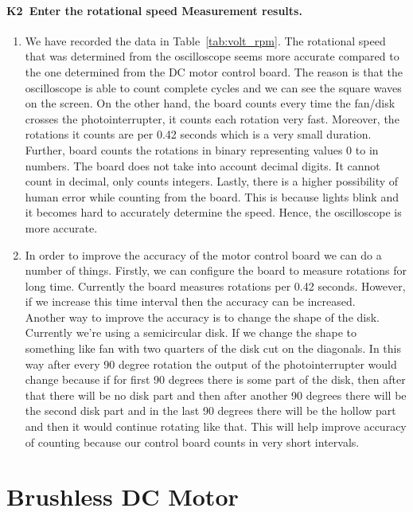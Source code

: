 \documentclass[12pt,a4paper]{report}
\begin{document}
\subsubsection{K2\ Enter the rotational speed Measurement results.}
\begin{enumerate}
	\item We have recorded the data in Table~\ref{tab:volt_rpm}. The rotational speed that was determined from the oscilloscope seems more accurate compared to the one determined from the DC motor control board. The reason is that the oscilloscope is able to count complete cycles and we can see the square waves on the screen. On the other hand, the board counts every time the fan/disk crosses the photointerrupter, it counts each rotation very fast. Moreover, the rotations it counts are per 0.42 seconds which is a very small duration. Further, board counts the rotations in binary representing values 0 to  in  numbers. The board does not take into account decimal digits. It cannot count in decimal, only counts integers. Lastly, there is a higher possibility of human error while counting from the board. This is because lights blink and it becomes hard to accurately determine the speed. Hence, the oscilloscope is more accurate. \\
	\item In order to improve the accuracy of the motor control board we can do a number of things. Firstly, we can configure the board to measure rotations for long time. Currently the board measures rotations per 0.42 seconds. However, if we increase this time interval then the accuracy can be increased. \\
		Another way to improve the accuracy is to change the shape of the disk. Currently we're using a semicircular disk. If we change the shape to something like fan with two quarters of the 
		disk cut on the diagonals. In this way after every 90 degree rotation the output of the photointerrupter would change because if for first 90 degrees there is some part of the disk, then 
		after that there will be no disk part and then after another 90 degrees there will be the second disk part and in the last 90 degrees there will be the hollow part 
		and then it would continue rotating like that. This will help improve accuracy of counting because our control board counts in very short intervals. 
\end{enumerate}

\chapter{Brushless DC Motor}
\end{document}
